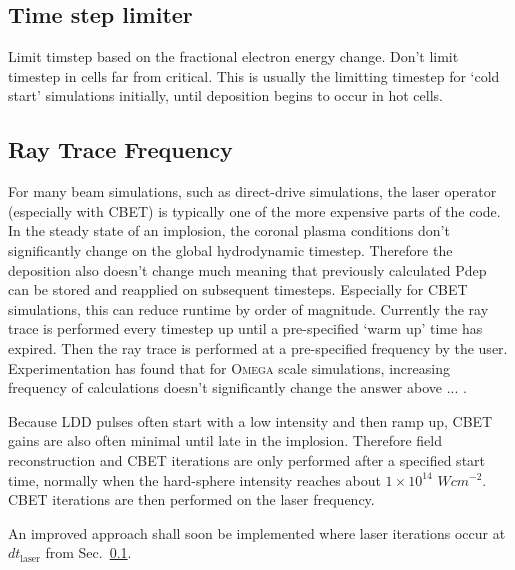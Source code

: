 \subsection{Time step limiter}%
\label{dtlaser}

Limit timstep based on the fractional electron energy change.
Don't limit timestep in cells far from critical.
This is usually the limitting timestep for `cold start' simulations initially, until deposition begins to occur in hot cells.

\subsection{Ray Trace Frequency}

For many beam simulations, such as direct-drive simulations, the laser operator (especially with CBET) is typically one of the more expensive parts of the code.
In the steady state of an implosion, the coronal plasma conditions don't significantly change on the global hydrodynamic timestep.
Therefore the deposition also doesn't change much meaning that previously calculated Pdep can be stored and reapplied on subsequent timesteps.
Especially for CBET simulations, this can reduce runtime by order of magnitude.
Currently the ray trace is performed every timestep up until a pre-specified `warm up' time has expired.
Then the ray trace is performed at a pre-specified frequency by the user.
Experimentation has found that for \textsc{Omega} scale simulations, increasing frequency of calculations doesn't significantly change the answer above ... .

Because LDD pulses often start with a low intensity and then ramp up, CBET gains are also often minimal until late in the implosion.
Therefore field reconstruction and CBET iterations are only performed after a specified start time, normally when the hard-sphere intensity reaches about $1\times 10^{14}$ $Wcm^{-2}$.
CBET iterations are then performed on the laser frequency.

An improved approach shall soon be implemented where laser iterations occur at $dt_{\text{laser}}$ from Sec.~\ref{dtlaser}.

